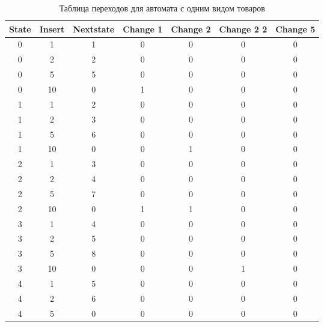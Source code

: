 \begin{table}[]
\caption{Таблица переходов для автомата с одним видом товаров}
\begin{tabular}{|c|c|c|c|c|c|c|}
\hline
State & Insert & Nextstate & Change 1 & Change 2 & Change 2 2 & Change 5 \\ \hline
0     & 1      & 1         & 0        & 0        & 0          & 0        \\ \hline
0     & 2      & 2         & 0        & 0        & 0          & 0        \\ \hline
0     & 5      & 5         & 0        & 0        & 0          & 0        \\ \hline
0     & 10     & 0         & 1        & 0        & 0          & 0        \\ \hline
1     & 1      & 2         & 0        & 0        & 0          & 0        \\ \hline
1     & 2      & 3         & 0        & 0        & 0          & 0        \\ \hline
1     & 5      & 6         & 0        & 0        & 0          & 0        \\ \hline
1     & 10     & 0         & 0        & 1        & 0          & 0        \\ \hline
2     & 1      & 3         & 0        & 0        & 0          & 0        \\ \hline
2     & 2      & 4         & 0        & 0        & 0          & 0        \\ \hline
2     & 5      & 7         & 0        & 0        & 0          & 0        \\ \hline
2     & 10     & 0         & 1        & 1        & 0          & 0        \\ \hline
3     & 1      & 4         & 0        & 0        & 0          & 0        \\ \hline
3     & 2      & 5         & 0        & 0        & 0          & 0        \\ \hline
3     & 5      & 8         & 0        & 0        & 0          & 0        \\ \hline
3     & 10     & 0         & 0        & 0        & 1          & 0        \\ \hline
4     & 1      & 5         & 0        & 0        & 0          & 0        \\ \hline
4     & 2      & 6         & 0        & 0        & 0          & 0        \\ \hline
4     & 5      & 0         & 0        & 0        & 0          & 0        \\ \hline

\end{tabular}
\end{table}
